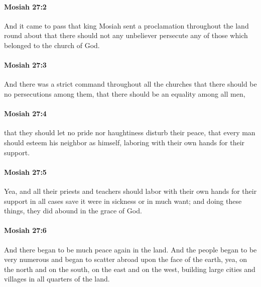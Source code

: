 		\paragraph{Mosiah 27:2} %
			\label{MOSIAH-27-2}

			And it came to pass that
			king Mosiah sent a proclamation throughout the land round about
			that there should not any unbeliever persecute any of those
			which belonged to the church of God.

		\paragraph{Mosiah 27:3} %
			\label{MOSIAH-27-3}

			And there was a strict command throughout all the churches
			that there should be no persecutions among them,
			that there should be an equality among all men,

		\paragraph{Mosiah 27:4} %
			\label{MOSIAH-27-4}

			that they should let no pride nor haughtiness disturb their peace,
			that every man should esteem his neighbor as himself,
			laboring with their own hands for their support.

		\paragraph{Mosiah 27:5} %
			\label{MOSIAH-27-5}

			Yea, and all their priests and teachers should labor with their own hands
			for their support in all cases save it were in sickness or in much want;
			and doing these things, they did abound in the grace of God.

		\paragraph{Mosiah 27:6} %
			\label{MOSIAH-27-6}

			And there began to be much peace again in the land.
			And the people began to be very numerous
			and began to scatter abroad upon the face of the earth,
			yea, on the north and on the south, on the east and on the west,
			building large cities and villages in all quarters of the land.

